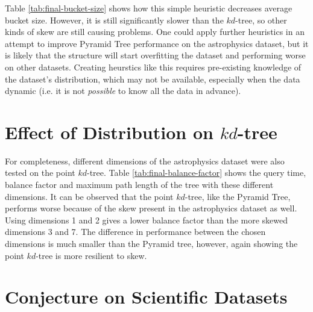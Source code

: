Table \ref{tab:final-bucket-size} shows how this simple heuristic decreases average bucket size. However, it is still significantly slower than the $kd$-tree, so other kinds of skew are still causing problems. One could apply further heuristics in an attempt to improve Pyramid Tree performance on the astrophysics dataset, but it is likely that the structure will start overfitting the dataset and performing worse on other datasets. Creating heurstics like this requires pre-existing knowledge of the dataset's distribution, which may not be available, especially when the data dynamic (i.e. it is not \textit{possible} to know all the data in advance).

\section{Effect of Distribution on $kd$-tree}

For completeness, different dimensions of the astrophysics dataset were also tested on the point $kd$-tree. Table \ref{tab:final-balance-factor} shows the query time, balance factor and maximum path length of the tree with these different dimensions. It can be observed that the point $kd$-tree, like the Pyramid Tree, performs worse because of the skew present in the astrophysics dataset as well. Using dimensions 1 and 2 gives a lower balance factor than the more skewed dimensions 3 and 7. The difference in performance between the chosen dimensions is much smaller than the Pyramid tree, however, again showing the point $kd$-tree is more resilient to skew.

\begin{table}
	\centering
	\caption{Point $kd$-tree Statistics with Different Dimensions of Astrophysics Dataset}
	\label{tab:final-balance-factor}
\end{table}

\section{Conjecture on Scientific Datasets}


